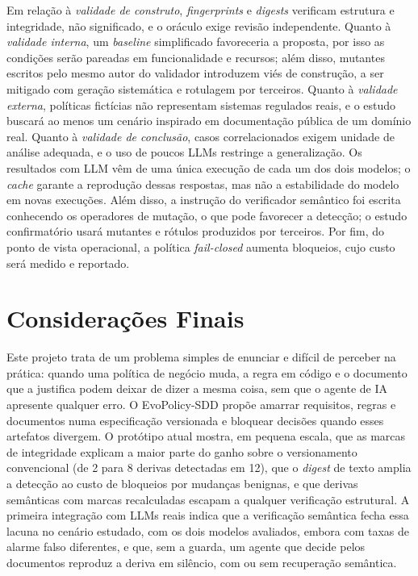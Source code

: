 \documentclass[12pt]{article}
\begin{document}
Em relação à \textit{validade de construto}, \textit{fingerprints} e \textit{digests} verificam estrutura e integridade, não significado, e o oráculo exige revisão independente. Quanto à \textit{validade interna}, um \textit{baseline} simplificado favoreceria a proposta, por isso as condições serão pareadas em funcionalidade e recursos; além disso, mutantes escritos pelo mesmo autor do validador introduzem viés de construção, a ser mitigado com geração sistemática e rotulagem por terceiros. Quanto à \textit{validade externa}, políticas fictícias não representam sistemas regulados reais, e o estudo buscará ao menos um cenário inspirado em documentação pública de um domínio real. Quanto à \textit{validade de conclusão}, casos correlacionados exigem unidade de análise adequada, e o uso de poucos LLMs restringe a generalização. Os resultados com LLM vêm de uma única execução de cada um dos dois modelos; o \textit{cache} garante a reprodução dessas respostas, mas não a estabilidade do modelo em novas execuções. Além disso, a instrução do verificador semântico foi escrita conhecendo os operadores de mutação, o que pode favorecer a detecção; o estudo confirmatório usará mutantes e rótulos produzidos por terceiros. Por fim, do ponto de vista operacional, a política \textit{fail-closed} aumenta bloqueios, cujo custo será medido e reportado.

\section{Considerações Finais}
\label{sec8:final}

Este projeto trata de um problema simples de enunciar e difícil de perceber na prática: quando uma política de negócio muda, a regra em código e o documento que a justifica podem deixar de dizer a mesma coisa, sem que o agente de IA apresente qualquer erro. O EvoPolicy-SDD propõe amarrar requisitos, regras e documentos numa especificação versionada e bloquear decisões quando esses artefatos divergem. O protótipo atual mostra, em pequena escala, que as marcas de integridade explicam a maior parte do ganho sobre o versionamento convencional (de 2 para 8 derivas detectadas em 12), que o \textit{digest} de texto amplia a detecção ao custo de bloqueios por mudanças benignas, e que derivas semânticas com marcas recalculadas escapam a qualquer verificação estrutural. A primeira integração com LLMs reais indica que a verificação semântica fecha essa lacuna no cenário estudado, com os dois modelos avaliados, embora com taxas de alarme falso diferentes, e que, sem a guarda, um agente que decide pelos documentos reproduz a deriva em silêncio, com ou sem recuperação semântica.
\end{document}
